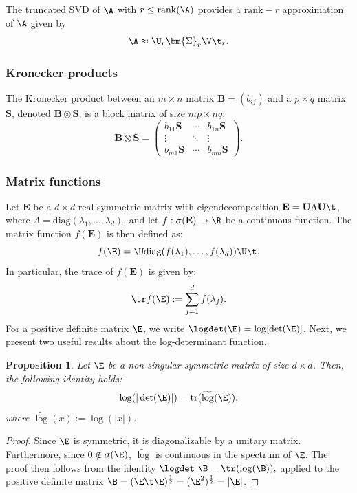 \documentclass{aims} %
\newtheorem{proposition}[theorem]{Proposition}
\theoremstyle{definition}
\begin{document}
The truncated SVD of $\A$  with \(r \leq \mathrm{rank}(\A)\) provides a  \(\mathrm{rank}\!-r\) approximation of \(\A\) given by  
\begin{align}\label{def:TSVD}
\A\approx \U_r \bm{\Sigma}_r \V\t_r.
\end{align}
%
%
\subsubsection*{Kronecker products}   
The Kronecker product between an $m\times n$ matrix $\mathbf{B} = (b_{ij})$ and a $p\times q$ matrix $\mathbf{S}$, denoted $\mathbf{B} \otimes \mathbf{S}$, is a block matrix of size $mp \times nq$:
\[
\mathbf{B} \otimes \mathbf{S} = \begin{pmatrix}
b_{11}\mathbf{S} & \cdots & b_{1n}\mathbf{S} \\
\vdots & \ddots & \vdots \\
b_{m1}\mathbf{S} & \cdots & b_{mn}\mathbf{S}
\end{pmatrix}.
\]

\subsubsection*{Matrix functions}
Let $\mathbf{E}$ be a $d \times d$ real  symmetric matrix with eigendecomposition $\mathbf{E} = \mathbf{U} \Lambda \mathbf{U}\t$, where $\Lambda = \mathrm{diag}(\lambda_1, \ldots, \lambda_d)$, and let $f: \sigma(\mathbf{E}) \to \R$ be a continuous function. The matrix function \( f(\mathbf{E}) \) is then defined as:  
\[
f(\E)= \U \mathrm{diag}(f(\lambda_1), \ldots, f(\lambda_d))\U\t.
\]
In particular, the trace of \( f(\mathbf{E}) \) is given by: 
%
\begin{align}
\tr f(\E) := \sum_{j=1}^d f(\lambda_j).\label{def:trace_f(E)}
\end{align}
%
For a positive definite matrix $\E$, we write $\logdet(\E) = \log[\det(\E)]$. Next, we present two useful results about the log-determinant function.
%
\begin{proposition}
Let \(\E\) be a non-singular symmetric matrix of size \(d \times d\). 
Then, the following identity holds:
\[
\log(|\det(\E)|) = \mathrm{tr}(\widetilde{\log}(\E)),
\]
where \(\widetilde{\log}(x) := \log(|x|)\).
\end{proposition}

\begin{proof}
Since \(\E\) is symmetric, it is diagonalizable by a unitary matrix.
Furthermore, since \(0 \notin \sigma(\E)\), \(\widetilde{\log}\) is continuous in the spectrum of \(\E\). 
The proof then follows from the identity
$
\logdet ~\B =\tr(\log(\B)), 
$
applied to the positive definite  matrix 
$\B = ({\E\t\E})^{\frac 12}=(\E^2)^{\frac 12}=|\E|$.
\end{proof}
\end{document}
